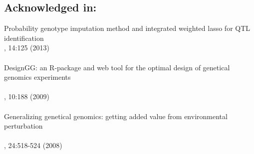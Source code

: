 \subsection*{Acknowledged in:}
  Probability genotype imputation method and integrated weighted lasso for QTL identification\\
  , 14:125 (2013)\\\\   
  DesignGG: an R-package and web tool for the optimal design of genetical genomics experiments\\
  \\
  , 10:188 (2009)\\\\
  Generalizing genetical genomics: getting added value from environmental perturbation\\
  \\
  , 24:518-524 (2008)

